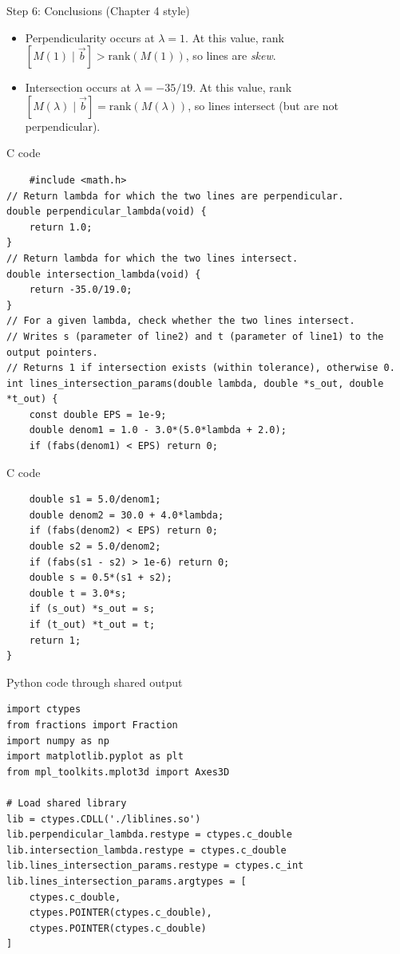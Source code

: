 \documentclass{beamer}
\begin{document}
\begin{frame}{Step 6: Conclusions (Chapter 4 style)}
\begin{itemize}
\item Perpendicularity occurs at \(\lambda=1\). At this value, rank\([M(1)\mid \vec b] > \text{rank}(M(1))\), so lines are \emph{skew}.
\item Intersection occurs at \(\lambda=-35/19\). At this value, rank\([M(\lambda)\mid \vec b] = \text{rank}(M(\lambda))\), so lines intersect (but are not perpendicular).
\end{itemize}
\end{frame}

\begin{frame}[fragile]{C code}
\begin{lstlisting}
    #include <math.h>
// Return lambda for which the two lines are perpendicular.
double perpendicular_lambda(void) {
    return 1.0;
}
// Return lambda for which the two lines intersect.
double intersection_lambda(void) {
    return -35.0/19.0;
}
// For a given lambda, check whether the two lines intersect.
// Writes s (parameter of line2) and t (parameter of line1) to the output pointers.
// Returns 1 if intersection exists (within tolerance), otherwise 0.
int lines_intersection_params(double lambda, double *s_out, double *t_out) {
    const double EPS = 1e-9;
    double denom1 = 1.0 - 3.0*(5.0*lambda + 2.0);
    if (fabs(denom1) < EPS) return 0;
     \end{lstlisting}
\end{frame}
    \begin{frame}[fragile]{C code}
\begin{lstlisting}
    double s1 = 5.0/denom1;
    double denom2 = 30.0 + 4.0*lambda;
    if (fabs(denom2) < EPS) return 0;
    double s2 = 5.0/denom2;
    if (fabs(s1 - s2) > 1e-6) return 0;
    double s = 0.5*(s1 + s2);
    double t = 3.0*s;
    if (s_out) *s_out = s;
    if (t_out) *t_out = t;
    return 1;
}
 \end{lstlisting}
\end{frame}
    \begin{frame}[fragile]{Python code through shared output}
\begin{lstlisting}
import ctypes
from fractions import Fraction
import numpy as np
import matplotlib.pyplot as plt
from mpl_toolkits.mplot3d import Axes3D

# Load shared library
lib = ctypes.CDLL('./liblines.so')
lib.perpendicular_lambda.restype = ctypes.c_double
lib.intersection_lambda.restype = ctypes.c_double
lib.lines_intersection_params.restype = ctypes.c_int
lib.lines_intersection_params.argtypes = [
    ctypes.c_double,
    ctypes.POINTER(ctypes.c_double),
    ctypes.POINTER(ctypes.c_double)
]
\end{lstlisting}
\end{frame}
\end{document}
